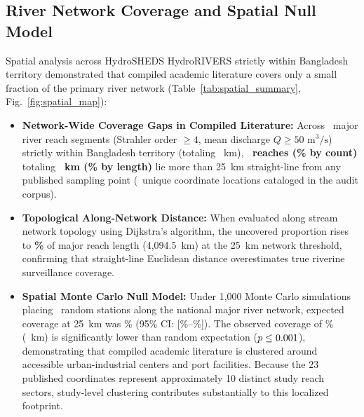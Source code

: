 \documentclass[authoryear,preprint,12pt]{elsarticle}
\begin{document}
\subsection{River Network Coverage and Spatial Null Model}
Spatial analysis across HydroSHEDS HydroRIVERS strictly within Bangladesh territory demonstrated that compiled academic literature covers only a small fraction of the primary river network (Table~\ref{tab:spatial_summary}, Fig.~\ref{fig:spatial_map}):
\begin{itemize}
    \item \textbf{Network-Wide Coverage Gaps in Compiled Literature:} Across \TotalMajorReachesCount\ major river reach segments (Strahler order $\ge 4$, mean discharge $Q \ge 50\text{ m}^3/\text{s}$) strictly within Bangladesh territory (totaling \TotalMajorLengthKm~km), \textbf{\UnsampledCountTwentyFiveKm\ reaches (\UnsampledPctCountTwentyFiveKm\% by count)} totaling \textbf{\UnsampledLengthTwentyFiveKm~km (\UnsampledPctLengthTwentyFiveKm\% by length)} lie more than 25~km straight-line from any published sampling point (\UniqueStationCoordinates\ unique coordinate locations cataloged in the audit corpus).
    \item \textbf{Topological Along-Network Distance:} When evaluated along stream network topology using Dijkstra's algorithm, the uncovered proportion rises to \textbf{\UnsampledPctLengthNetworkTwentyFiveKm\%} of major reach length (4,094.5~km) at the 25~km network threshold, confirming that straight-line Euclidean distance overestimates true riverine surveillance coverage.
    \item \textbf{Spatial Monte Carlo Null Model:} Under 1,000 Monte Carlo simulations placing \UniqueStationCoordinates\ random stations along the national major river network, expected coverage at 25~km was \NullModelMeanCoveragePct\% (95\% CI: [\NullModelCiLoPct\%--\NullModelCiHiPct\%]). The observed coverage of \ObservedCoveredPct\% (\ObservedCoveredLengthKm~km) is significantly lower than random expectation ($p \le 0.001$), demonstrating that compiled academic literature is clustered around accessible urban-industrial centers and port facilities. Because the 23 published coordinates represent approximately 10 distinct study reach sectors, study-level clustering contributes substantially to this localized footprint.
\end{itemize}
\end{document}
